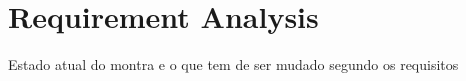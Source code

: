 \chapter{Requirement Analysis}
\label{chapter:requirement-analysis}

Estado atual do montra e o que tem de ser mudado segundo os requisitos

